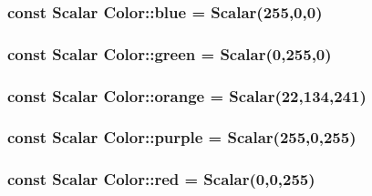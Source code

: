 \subsubsection[{\texorpdfstring{blue}{blue}}]{\setlength{\rightskip}{0pt plus 5cm}const Scalar Color\+::blue = Scalar(255,0,0)\hspace{0.3cm}{\ttfamily [static]}}\hypertarget{struct_color_ad65c713a1bfaa62c7c222379cd9591c9}{}\label{struct_color_ad65c713a1bfaa62c7c222379cd9591c9}
\subsubsection[{\texorpdfstring{green}{green}}]{\setlength{\rightskip}{0pt plus 5cm}const Scalar Color\+::green = Scalar(0,255,0)\hspace{0.3cm}{\ttfamily [static]}}\hypertarget{struct_color_a748ac4a0b884a70627083dc7c03318f5}{}\label{struct_color_a748ac4a0b884a70627083dc7c03318f5}
\subsubsection[{\texorpdfstring{orange}{orange}}]{\setlength{\rightskip}{0pt plus 5cm}const Scalar Color\+::orange = Scalar(22,134,241)\hspace{0.3cm}{\ttfamily [static]}}\hypertarget{struct_color_ad6a2ba9ca4e4fec8c23a5263abe2b8f7}{}\label{struct_color_ad6a2ba9ca4e4fec8c23a5263abe2b8f7}
\subsubsection[{\texorpdfstring{purple}{purple}}]{\setlength{\rightskip}{0pt plus 5cm}const Scalar Color\+::purple = Scalar(255,0,255)\hspace{0.3cm}{\ttfamily [static]}}\hypertarget{struct_color_aa1490dd2cb61e17be61287c61bb41cb7}{}\label{struct_color_aa1490dd2cb61e17be61287c61bb41cb7}
\subsubsection[{\texorpdfstring{red}{red}}]{\setlength{\rightskip}{0pt plus 5cm}const Scalar Color\+::red = Scalar(0,0,255)\hspace{0.3cm}{\ttfamily [static]}}\hypertarget{struct_color_a3a719c8fa99595a064873ff3735b191e}{}\label{struct_color_a3a719c8fa99595a064873ff3735b191e}
